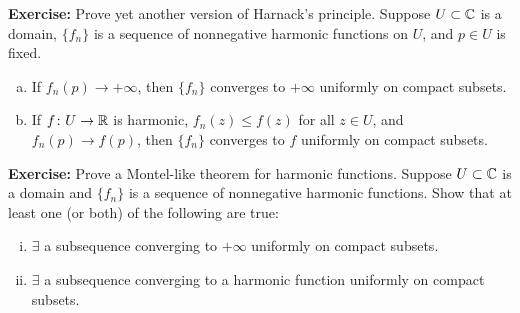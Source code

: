 \documentclass[10pt,aspectratio=169]{beamer}
\begin{document}
\begin{frame}
\textbf{Exercise:}
Prove yet another version of Harnack's principle.
Suppose $U \subset {\mathbb{C}}$ is a domain,
$\{ f_n \}$ is a sequence of nonnegative harmonic functions on
$U$, and $p \in U$ is fixed.
\begin{enumerate}[a)]
\item
If $f_n(p) \to +\infty$, then $\{ f_n \}$ converges to $+\infty$ uniformly on
compact subsets.
\item
If $f \colon U \to {\mathbb{R}}$ is harmonic, $f_n(z) \leq f(z)$ for all $z \in U$,
and $f_n(p) \to f(p)$, then $\{ f_n \}$ converges to $f$ uniformly on
compact subsets.
\end{enumerate}

\medskip
\pause

\textbf{Exercise:}
Prove a Montel-like theorem for harmonic functions.  Suppose $U \subset {\mathbb{C}}$
is a domain and $\{ f_n \}$ is a sequence of nonnegative harmonic functions.
Show that at least one (or both) of the following are true:
\begin{enumerate}[(i)]
\item
$\exists$ a subsequence converging to $+\infty$ uniformly on compact subsets.
\item
$\exists$ a subsequence converging to a harmonic function
uniformly on compact subsets.
\end{enumerate}

\end{frame}
\end{document}

